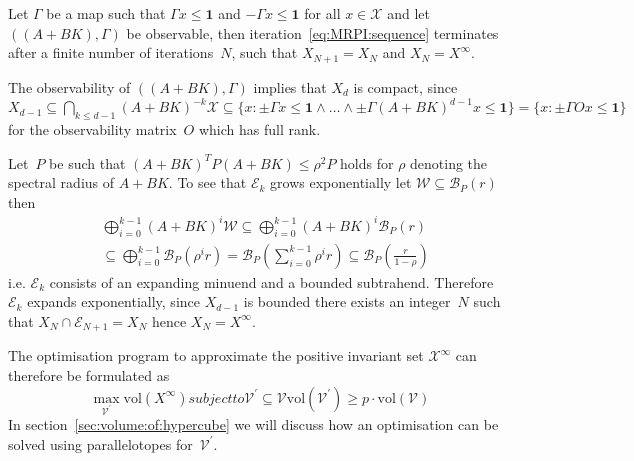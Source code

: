 \documentclass{ifacconf}
\providecommand{\vol}{\text{vol}}
\providecommand{\B}{\mathcal B}
\providecommand{\E}{\mathcal E}
\providecommand{\W}{\mathcal W}
\providecommand{\V}{\mathcal V}
\providecommand{\X}{\mathcal X}
\providecommand{\bfa}[1]{\mathbf{#1}}
\begin{document}
\begin{thm}
Let $\Gamma$ be a map such that $\Gamma x\leq\bfa{1}$ and $-\Gamma x\leq\bfa{1}$ for all $x\in\X$ and let $((A+BK),\Gamma)$ be observable, then iteration~\eqref{eq:MRPI:sequence} terminates after a finite number of iterations~$N$, such that $X_{N+1}=X_N$ and $X_N=X^\infty$.
\end{thm}
%
\begin{pf}
%
The observability of $((A+BK),\Gamma)$ implies that $X_d$ is compact, since $X_{d-1}\subseteq\bigcap_{k\leq d-1}(A+BK)^{-k}\X\subseteq\{x:\pm\Gamma x\leq\bfa{1}\wedge\dots\wedge\pm\Gamma(A+BK)^{d-1} x\leq\bfa{1}\} = \{x:\pm\Gamma Ox\leq \bfa{1}\}$ for the observability matrix~$O$ which has full rank.

Let~$P$ be such that $(A+BK)^TP(A+BK)\leq\rho^2P$ holds for $\rho$ denoting the spectral radius of $A+BK$.
%
To see that $\E_k$ grows exponentially let $\W\subseteq\B_P(r)$ then
%
\begin{equation}\begin{split}
	&\bigoplus_{i=0}^{k-1}(A+BK)^i\W \subseteq \bigoplus_{i=0}^{k-1}(A+BK)^i\B_P(r)\\
	&\subseteq\bigoplus_{i=0}^{k-1}\B_P(\rho^i r) = \B_P(\sum_{i=0}^{k-1}\rho^i r)\subseteq\B_P(\frac{r}{1-\rho})
\end{split}\end{equation}
%
i.e. $\E_k$ consists of an expanding minuend and a bounded subtrahend.
%
Therefore $\E_k$ expands exponentially, since $X_{d-1}$ is bounded there exists an integer~$N$ such that $X_{N}\cap\E_{N+1}=X_N$ hence $X_N=X^\infty$.
%
\end{pf}

The optimisation program to approximate the positive invariant set $\X^\infty$ can therefore be formulated as
%
\begin{subequations}\label{seq:optimisation:MRPI:abstract}
	\begin{equation}
		\max_{\V^\prime} \vol(X^\infty)
	\end{equation}
%
	subject to
%
\begin{equation}
	\V^\prime\subseteq\V
\end{equation}
%
\begin{equation}
	\vol(\V^\prime)\geq p\cdot\vol(\V)
\end{equation}
\end{subequations}
%
In section~\ref{sec:volume:of:hypercube} we will discuss how an optimisation can be solved using parallelotopes for~$\V^\prime$.
\end{document}
